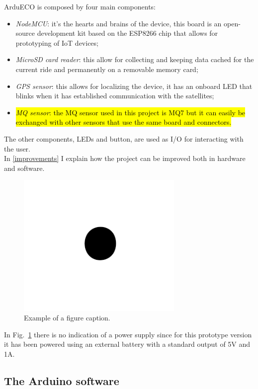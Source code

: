 \documentclass[conference]{IEEEtran}
\DeclareRobustCommand{\hlcyan}[1]{{\sethlcolor{cyan}\hl{#1}}}
\begin{document}
		ArduECO is composed by four main components:
		\begin{itemize}
			\item \textit{NodeMCU}: it's the hearts and brains of the device, this board is an open-source development kit based on the ESP8266 chip that allows for prototyping of IoT devices;
			\item \textit{MicroSD card reader}: this allow for collecting and keeping data cached for the current ride and permanently on a removable memory card;
			\item \textit{GPS sensor}: this allows for localizing the device, it has an onboard LED that blinks when it has established communication with the satellites;
			\item \hlcyan{\textit{MQ sensor}: the MQ sensor used in this project is MQ7 but it can easily be exchanged with other sensors that use the same board and connectors.}
		\end{itemize}
		The other components, LEDs and button, are used as I/O for interacting with the user.\\
		In \ref{improvements} I explain how the project can be improved both in hardware and software.
		\begin{figure}[htbp]
			\centerline{\includegraphics[width=8cm]{fig1.png}}
			\caption{Example of a figure caption.}
			\label{schematics}
		\end{figure}
		In Fig.~\ref{schematics} there is no indication of a power supply since for this prototype version it has been powered using an external battery with a standard output of 5V and 1A.
	
	\subsection{The Arduino software}
	
\end{document}
